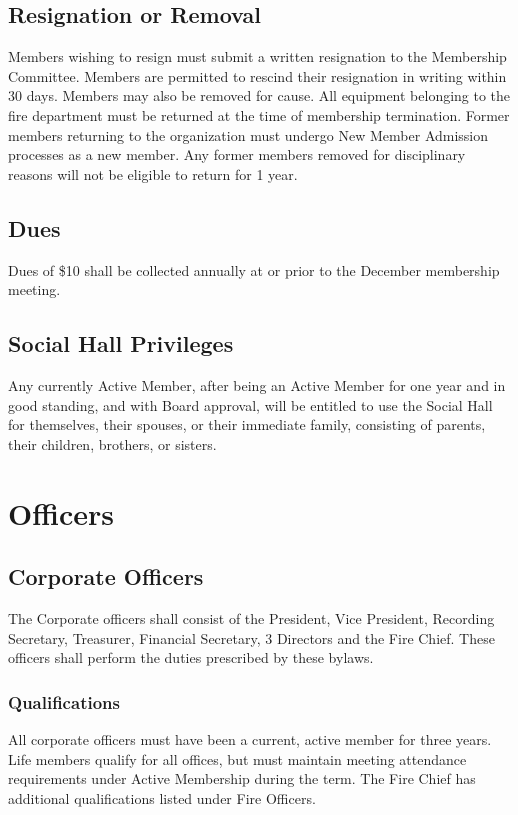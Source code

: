 ﻿\documentclass[12pt,letterpaper]{article}
\begin{document}
\subsection{Resignation or Removal}
Members wishing to resign must submit a written resignation to the Membership Committee.  Members are permitted to rescind their resignation in writing within 30 days.  Members may also be removed for cause.  All equipment belonging to the fire department must be returned at the time of membership termination.  Former members returning to the organization must undergo New Member Admission processes as a new member.  Any former members removed for disciplinary reasons will not be eligible to return for 1 year.

\subsection{Dues}
Dues of \$10 shall be collected annually at or prior to the December membership meeting.

\subsection{Social Hall Privileges}
Any currently Active Member, after being an Active Member for one year and in good standing, and with Board approval, will be entitled to use the Social Hall for themselves, their spouses, or their immediate family, consisting of parents, their children, brothers, or sisters.

\section{Officers}

\subsection{Corporate Officers}
The Corporate officers shall consist of the President, Vice President, Recording Secretary, Treasurer, Financial Secretary, 3 Directors and the Fire Chief.  These officers shall perform the duties prescribed by these bylaws.

\subsubsection{Qualifications}
All corporate officers must have been a current, active member for three years.  Life members qualify for all offices, but must maintain meeting attendance requirements under Active Membership during the term.  The Fire Chief has additional qualifications listed under Fire Officers.
\end{document}
